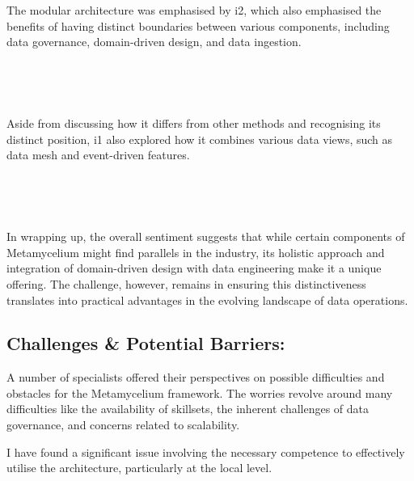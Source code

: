 \documentclass[journal]{IEEEtran}
\begin{document}
\,

\setlength{\fboxsep}{0.3em}
\noindent{}

\,

The modular architecture was emphasised by i2, which also emphasised the benefits of having distinct boundaries between various components, including data governance, domain-driven design, and data ingestion.


\,

\setlength{\fboxsep}{0.3em}
\noindent{}

\,

Aside from discussing how it differs from other methods and recognising its distinct position, i1 also explored how it combines various data views, such as data mesh and event-driven features.

\,

\setlength{\fboxsep}{0.3em}
\noindent{}

\,

In wrapping up, the overall sentiment suggests that while certain components of Metamycelium might find parallels in the industry, its holistic approach and integration of domain-driven design with data engineering make it a unique offering. The challenge, however, remains in ensuring this distinctiveness translates into practical advantages in the evolving landscape of data operations.

\subsection{Challenges \& Potential Barriers:}

A number of specialists offered their perspectives on possible difficulties and obstacles for the Metamycelium framework. The worries revolve around many difficulties like the availability of skillsets, the inherent challenges of data governance, and concerns related to scalability.

I have found a significant issue involving the necessary competence to effectively utilise the architecture, particularly at the local level.
\end{document}
